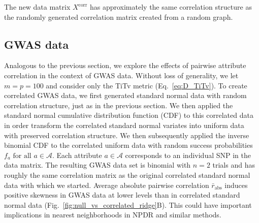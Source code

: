 \documentclass[10pt,letterpaper]{article}
\begin{document}
The new data matrix $X^\text{corr}$ has approximately the same correlation structure as the randomly generated correlation matrix created from a random graph.

\subsection*{GWAS data}

Analogous to the previous section, we explore the effects of pairwise attribute correlation in the context of GWAS data. Without loss of generality, we let $m=p=100$ and consider only the TiTv metric (Eq.~\ref{eq:D_TiTv}). To create correlated GWAS data, we first generated standard normal data with random correlation structure, just as in the previous section. We then applied the standard normal cumulative distribution function (CDF) to this correlated data in order transform the correlated standard normal variates into uniform data with preserved correlation structure. We then subsequently applied the inverse binomial CDF to the correlated uniform data with random success probabilities $f_a \text{ for all } a \in \mathcal{A}$. Each attribute $a \in \mathcal{A}$ corresponds to an individual SNP in the data matrix. The resulting GWAS data set is binomial with $n=2$ trials and has roughly the same correlation matrix as the original correlated standard normal data with which we started. Average absolute pairwise correlation $\bar{r}_\text{abs}$ induces positive skewness in GWAS data at lower levels than in correlated standard normal data (Fig.~\ref{fig:null_vs_correlated_ridge}B). This could have important implications in nearest neighborhoods in NPDR and similar methods.
%
\end{document}
